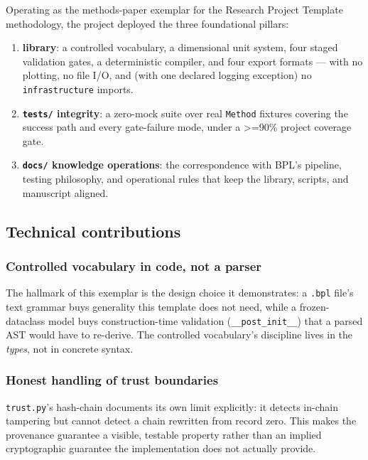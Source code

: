 \documentclass[
  english,
]{article}
\providecommand{\tightlist}{%
  \setlength{\itemsep}{0pt}\setlength{\parskip}{0pt}}
\begin{document}
Operating as the methods-paper exemplar for the Research Project
Template methodology, the project deployed the three foundational
pillars:

\begin{enumerate}
\def\labelenumi{\arabic{enumi}.}
\tightlist
\item
  \textbf{ library}: a controlled vocabulary,
  a dimensional unit system, four staged validation gates, a
  deterministic compiler, and four export formats --- with no plotting,
  no file I/O, and (with one declared logging exception) no
  \texttt{infrastructure} imports.
\item
  \textbf{\texttt{tests/} integrity}: a zero-mock suite over real
  \texttt{Method} fixtures covering the success path and every
  gate-failure mode, under a \texorpdfstring{\textgreater{}=}{>=}90\% project coverage gate.
\item
  \textbf{\texttt{docs/} knowledge operations}: the correspondence with
  BPL's pipeline, testing philosophy, and operational rules that keep
  the library, scripts, and manuscript aligned.
\end{enumerate}

\subsection{Technical contributions}\label{technical-contributions}

\subsubsection{Controlled vocabulary in code, not a
parser}\label{controlled-vocabulary-in-code-not-a-parser}

The hallmark of this exemplar is the design choice it demonstrates: a
\texttt{.bpl} file's text grammar buys generality this template does not
need, while a frozen-dataclass model buys construction-time validation
(\texttt{\_\_post\_init\_\_}) that a parsed AST would have to re-derive.
The controlled vocabulary's discipline lives in the \emph{types}, not in
concrete syntax.

\subsubsection{Honest handling of trust
boundaries}\label{honest-handling-of-trust-boundaries}

\texttt{trust.py}'s hash-chain documents its own limit explicitly: it
detects in-chain tampering but cannot detect a chain rewritten from
record zero. This makes the provenance guarantee a visible, testable
property rather than an implied cryptographic guarantee the
implementation does not actually provide.
\end{document}
